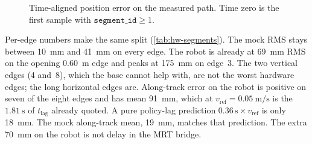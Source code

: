 \begin{figure}[htbp]
  \centering
  \caption[Time-aligned \ee{} position error on the measured path]{%
    Time-aligned \ee{} position error on the measured path. Time zero is
    the first sample with $\texttt{segment\_id}\ge 1$.}
  \label{fig:hw-error}
\end{figure}

Per-edge numbers make the same split (\cref{tab:hw-segments}). The mock
RMS stays between \qty{10}{\milli\meter} and \qty{41}{\milli\meter} on
every edge. The robot is already at \qty{69}{\milli\meter} RMS on the
opening \qty{0.60}{\meter} edge and peaks at \qty{175}{\milli\meter} on
edge~3. The two vertical edges (4 and~8), which the base cannot help
with, are not the worst hardware edges; the long horizontal edges are.
Along-track error on the robot is positive on seven of the eight edges
and has mean \qty{91}{\milli\meter}, which at
$v_{\mathrm{ref}}=\qty{0.05}{\meter\per\second}$ is the
$\qty{1.81}{\second}$ of $t_{\mathrm{lag}}$ already quoted. A pure
policy-lag prediction $0.36\,\mathrm{s}\times v_{\mathrm{ref}}$ is only
\qty{18}{\milli\meter}. The mock along-track mean, \qty{19}{\milli\meter},
matches that prediction. The extra \qty{70}{\milli\meter} on the robot
is not delay in the MRT bridge.

